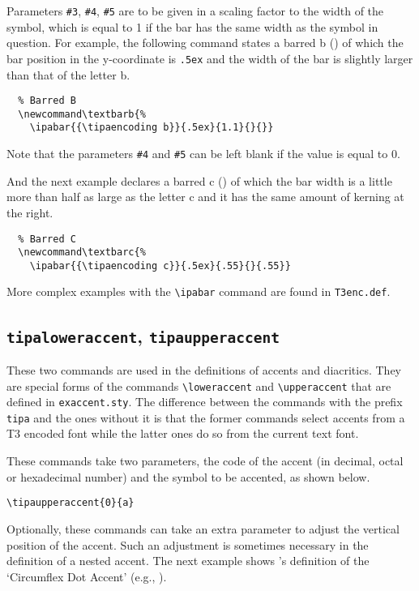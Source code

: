 Parameters \texttt{\#3}, \texttt{\#4}, \texttt{\#5} are to be given in
a scaling factor to the width of the symbol, which is equal to 1 if
the bar has the same width as the symbol in question. For example,
the following command states a barred b (\textbarb) of which the bar
position in the y-coordinate is \verb|.5ex| and the width of the bar
is slightly larger than that of the letter b.

\begin{verbatim}
  % Barred B
  \newcommand\textbarb{%
    \ipabar{{\tipaencoding b}}{.5ex}{1.1}{}{}}
\end{verbatim}

Note that the parameters \texttt{\#4} and \texttt{\#5} can be left
blank if the value is equal to 0.

And the next example declares a barred c (\textbarc) of which the bar
width is a little more than half as large as the letter c and it has
the same amount of kerning at the right.

\begin{verbatim}
  % Barred C
  \newcommand\textbarc{%
    \ipabar{{\tipaencoding c}}{.5ex}{.55}{}{.55}}
\end{verbatim}

More complex examples with the \verb|\ipabar| command are found in
\texttt{T3enc.def}.

\subsection{{\tt\tbs tipaloweraccent}, {\tt\tbs tipaupperaccent}}

These two commands are used in the definitions of \tipa{} accents and
diacritics. They are special forms of the commands \verb|\loweraccent|
and \verb|\upperaccent| that are defined in \texttt{exaccent.sty}. The
difference between the commands with the prefix \verb|tipa| and the
ones without it is that the former commands select accents from a T3
encoded font while the latter ones do so from the current text font.

These commands take two parameters, the code of the accent (in
decimal, octal or hexadecimal number) and the
symbol to be accented, as shown below.

\begin{tipaexample}
  \yitem \verb|\tipaupperaccent{0}{a}|
  \yitem {}
\end{tipaexample}

Optionally, these commands can take an extra parameter to adjust the
vertical position of the accent. Such an adjustment is sometimes
necessary in the definition of a nested accent. The next example shows
\tipa's definition of the `Circumflex Dot Accent' (e.g., 
).

